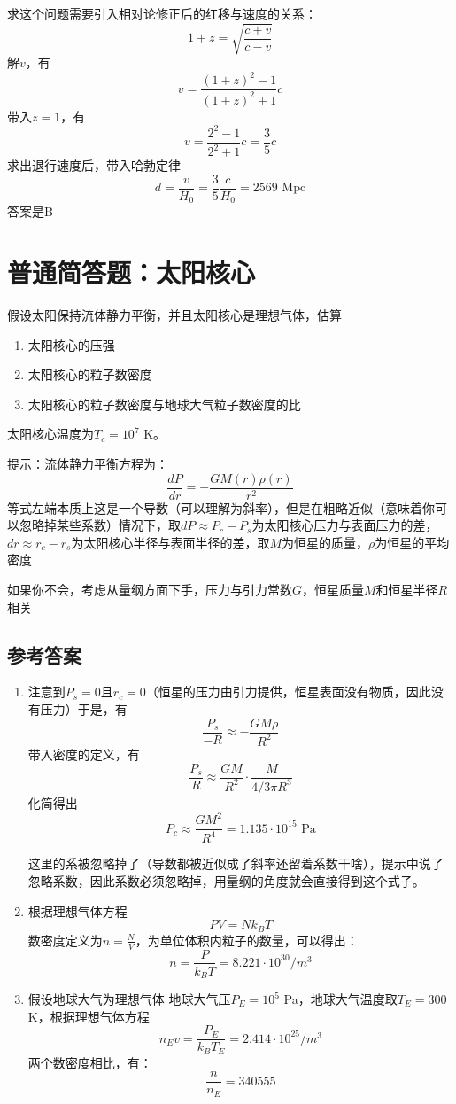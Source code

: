 \documentclass[UTF8]{ctexart}
\numberwithin{equation}{section}
\begin{document}
求这个问题需要引入相对论修正后的红移与速度的关系：
\[
1+z = \sqrt{\frac{c+v}{c-v}}
\]
解$v$，有
\[
v = \frac{(1+z)^2-1}{(1+z)^2+1}c
\]
带入$z=1$，有 
\[
v = \frac{2^2-1}{2^2+1}c = \frac{3}{5}c
\]
求出退行速度后，带入哈勃定律
\[
d = \frac{v}{H_0} = \frac{3}{5} \frac{c}{H_0} = 2569 \text{ Mpc}
\]
答案是B

\newpage
\section{普通简答题：太阳核心}
假设太阳保持流体静力平衡，并且太阳核心是理想气体，估算
\begin{enumerate}
    \item 太阳核心的压强
    \item 太阳核心的粒子数密度
    \item 太阳核心的粒子数密度与地球大气粒子数密度的比
\end{enumerate}
太阳核心温度为$T_c=10^7$ K。

提示：流体静力平衡方程为：
\[
\frac{dP}{dr}=-\frac{GM(r)\rho(r)}{r^2}
\]
等式左端本质上这是一个导数（可以理解为斜率），但是在粗略近似（意味着你可以忽略掉某些系数）情况下，取$dP\approx P_c-P_s$为太阳核心压力与表面压力的差，$dr\approx r_c-r_s$为太阳核心半径与表面半径的差，取$M$为恒星的质量，$\rho$为恒星的平均密度

如果你不会，考虑从量纲方面下手，压力与引力常数$G$，恒星质量$M$和恒星半径$R$相关

\newpage
\subsection{参考答案}
\begin{enumerate}
    \item 注意到$P_s=0$且$r_c=0$（恒星的压力由引力提供，恒星表面没有物质，因此没有压力）于是，有
\[
\frac{P_s}{-R}\approx -\frac{GM\rho}{R^2} 
\]
带入密度的定义，有
\[
\frac{P_s}{R} \approx \frac{GM}{R^2} \cdot \frac{M}{4/3\pi R^3}
\]
化简得出
\[
P_c \approx \frac{GM^2}{R^4} =1.135 \cdot 10^{15} \text{ Pa}
\]

这里的系被忽略掉了（导数都被近似成了斜率还留着系数干啥），提示中说了忽略系数，因此系数必须忽略掉，用量纲的角度就会直接得到这个式子。

\item 根据理想气体方程
\[
PV=Nk_B T
\]
数密度定义为$n = \displaystyle\frac{N}{V}$，为单位体积内粒子的数量，可以得出：
\[
n=\frac{P}{k_B T}=8.221\cdot 10^{30}/m^3
\]

\item 假设地球大气为理想气体 地球大气压$P_E=10^5$ Pa，地球大气温度取$T_E=300$ K，根据理想气体方程
\[
n_Ev= \frac{P_E}{k_B T_E }=2.414 \cdot 10^{25}/m^3
\]
两个数密度相比，有：
\[\frac{n}{n_E} =340555\]
\end{enumerate}
\end{document}
